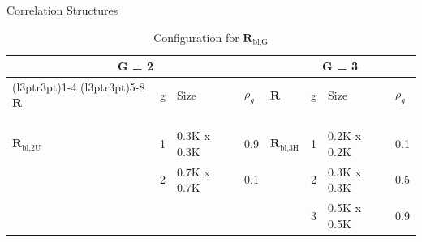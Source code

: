\documentclass[
  11pt,
  ignorenonframetext,
]{beamer}
\begin{document}
\begin{frame}{Correlation Structures}
\label{correlation-structures-1}
\begin{table}[H]
\centering
\caption{\label{tab:unnamed-chunk-16}Configuration for $\mathbf{R}_\text{{bl,G}}$}
\centering
\fontsize{12}{14}\selectfont
\begin{tabular}[t]{lclllcll}
\toprule
\multicolumn{4}{c}{G = 2} & \multicolumn{4}{c}{G = 3} \\
\cmidrule(l{3pt}r{3pt}){1-4} \cmidrule(l{3pt}r{3pt}){5-8}
$\mathbf{R}$ & g & Size & $\rho_g$ & $\mathbf{R}$ & g & Size & $\rho_g$\\
\midrule
\cellcolor{gray!15}{$\textbf{R}_\text{bl,2B}$} & \cellcolor{gray!15}{1} & \cellcolor{gray!15}{0.5K x 0.5K} & \cellcolor{gray!15}{0.9} & \cellcolor{gray!15}{$\textbf{R}_\text{bl,3L}$} & \cellcolor{gray!15}{1} & \cellcolor{gray!15}{0.2K x 0.2K} & \cellcolor{gray!15}{0.9}\\
\cellcolor{gray!15}{} & \cellcolor{gray!15}{2} & \cellcolor{gray!15}{0.5K x 0.5K} & \cellcolor{gray!15}{0.1} & \cellcolor{gray!15}{} & \cellcolor{gray!15}{2} & \cellcolor{gray!15}{0.3K x 0.3K} & \cellcolor{gray!15}{0.5}\\
\cellcolor{gray!15}{} & \cellcolor{gray!15}{} & \cellcolor{gray!15}{} & \cellcolor{gray!15}{} & \cellcolor{gray!15}{} & \cellcolor{gray!15}{3} & \cellcolor{gray!15}{0.5K x 0.5K} & \cellcolor{gray!15}{0.1}\\
\addlinespace[0.6em]
$\textbf{R}_\text{bl,2U}$ & 1 & 0.3K x 0.3K & 0.9 & $\textbf{R}_\text{bl,3H}$ & 1 & 0.2K x 0.2K & 0.1\\
 & 2 & 0.7K x 0.7K & 0.1 &  & 2 & 0.3K x 0.3K & 0.5\\
 &  &  &  &  & 3 & 0.5K x 0.5K & 0.9\\
\bottomrule
\end{tabular}
\end{table}

\end{frame}
\end{document}
